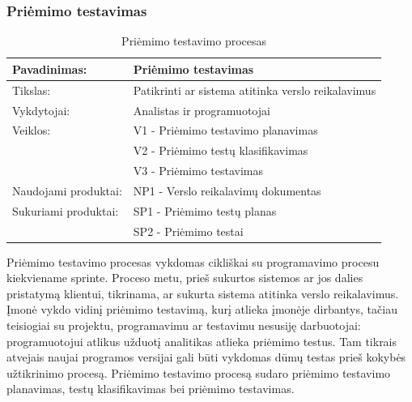 \documentclass{VUMIFPSkursinis}
\begin{document}
	\subsubsection{Priėmimo testavimas}
	\begin{center}
		\begin{table}[ht]
		\caption{Priėmimo testavimo procesas}
		\begin{tabular}{ | l | l | } 
		\hline
		Pavadinimas:         & Priėmimo testavimas                                       \\ \hline
		Tikslas: 	           & Patikrinti ar sistema atitinka verslo reikalavimus \\ \hline
		Vykdytojai:          & Analistas ir programuotojai                                \\ \hline
		Veiklos:             & V1 - Priėmimo testavimo planavimas													\\
						             & V2 - Priėmimo testų klasifikavimas					 \\
					 	             & V3 - Priėmimo testavimas 														\\ \hline
		Naudojami produktai: & NP1 - Verslo reikalavimų dokumentas 																				\\ \hline
		Sukuriami produktai: & SP1 - Priėmimo testų planas 																								\\
												 & SP2 - Priėmimo testai																	 \\ \hline
		\end{tabular}
	\end{table}
		\end{center}
	Priėmimo testavimo procesas vykdomas cikliškai su programavimo procesu kiekviename sprinte. Proceso metu, prieš sukurtos sistemos ar jos dalies pristatymą klientui, tikrinama, ar sukurta sistema atitinka verslo reikalavimus. Įmonė vykdo vidinį priėmimo testavimą, kurį atlieka įmonėje dirbantys, tačiau teisiogiai su projektu, programavimu ar testavimu nesusiję darbuotojai: programuotojui atlikus užduotį analitikas atlieka priėmimo testus. Tam tikrais atvejais naujai programos versijai gali būti vykdomas dūmų testas prieš kokybės užtikrinimo procesą. Priėmimo testavimo procesą sudaro priėmimo testavimo planavimas, testų klasifikavimas bei priėmimo testavimas.
\end{document}
